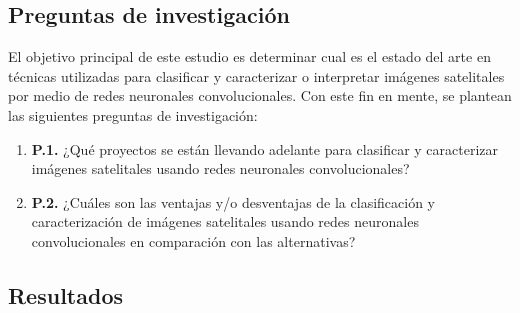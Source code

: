 \subsection{Preguntas de investigación}

El objetivo principal de este estudio es determinar cual es el estado del arte en técnicas utilizadas para clasificar y
caracterizar o interpretar imágenes satelitales por medio de redes neuronales convolucionales. Con este fin en mente,
se plantean las siguientes preguntas de investigación:

\begin{enumerate}
    \item[] {\bf P.1.} ¿Qué proyectos se están llevando adelante para clasificar y caracterizar imágenes satelitales usando redes neuronales convolucionales?
    \item[] {\bf P.2.} ¿Cuáles son las ventajas y/o desventajas de la clasificación y caracterización de imágenes satelitales usando redes neuronales convolucionales en comparación con las alternativas?
\end{enumerate}

\subsection{Resultados}

